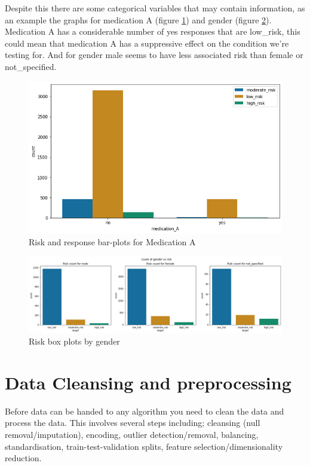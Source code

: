 \documentclass[a4paper]{article}
\begin{document}
Despite this there are some categorical variables that may contain information, as an example the graphs for medication A (figure \ref{fig:MedA box}) and gender (figure \ref{fig:gender box}). Medication A has a considerable number of yes responses that are low\_risk, this could mean that medication A has a suppressive effect on the condition we're testing for. And for gender male seems to have less associated risk than female or not\_specified.

\begin{figure}[h]
    \centering
    \includegraphics[width=0.75\linewidth]{Materials/Barplots/MedicationA.png}
    \caption{Risk and response bar-plots for Medication A}
    \label{fig:MedA box}
\end{figure}
\begin{figure}[h]
        \centering
        \includegraphics[width=1\linewidth]{Materials/Barplots/Gender.png}
        \caption{Risk box plots by gender}
        \label{fig:gender box}
    \end{figure}

\section{Data Cleansing and preprocessing}

Before data can be handed to any algorithm you need to clean the data and process the data. This involves several steps including; cleansing (null removal/imputation), encoding, outlier detection/removal, balancing, standardisation, train-test-validation splits, feature selection/dimensionality reduction.
\end{document}
